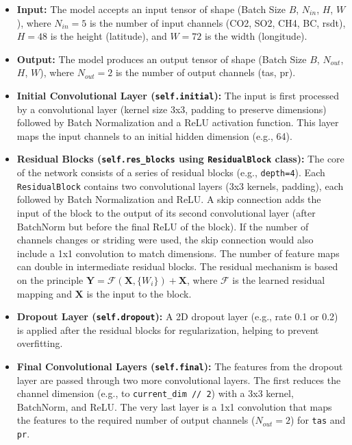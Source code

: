 \documentclass{article}
\begin{document}
\begin{itemize}
    \item \textbf{Input:} The model accepts an input tensor of shape (Batch Size \(B\), \(N_{in}\), \(H\), \(W\)), where \(N_{in}=5\) is the number of input channels (CO2, SO2, CH4, BC, rsdt), \(H=48\) is the height (latitude), and \(W=72\) is the width (longitude).
    \item \textbf{Output:} The model produces an output tensor of shape (Batch Size \(B\), \(N_{out}\), \(H\), \(W\)), where \(N_{out}=2\) is the number of output channels (tas, pr).
    \item \textbf{Initial Convolutional Layer (\texttt{self.initial}):} The input is first processed by a convolutional layer (kernel size 3x3, padding to preserve dimensions) followed by Batch Normalization and a ReLU activation function. This layer maps the input channels to an initial hidden dimension (e.g., 64).
    \item \textbf{Residual Blocks (\texttt{self.res\_blocks} using \texttt{ResidualBlock} class):} The core of the network consists of a series of residual blocks (e.g., \texttt{depth=4}). Each \texttt{ResidualBlock} contains two convolutional layers (3x3 kernels, padding), each followed by Batch Normalization and ReLU. A skip connection adds the input of the block to the output of its second convolutional layer (after BatchNorm but before the final ReLU of the block). If the number of channels changes or striding were used, the skip connection would also include a 1x1 convolution to match dimensions. The number of feature maps can double in intermediate residual blocks.
    The residual mechanism is based on the principle \( \mathbf{Y} = \mathcal{F}(\mathbf{X}, \{W_i\}) + \mathbf{X} \), where \( \mathcal{F} \) is the learned residual mapping and \( \mathbf{X} \) is the input to the block.
    \item \textbf{Dropout Layer (\texttt{self.dropout}):} A 2D dropout layer (e.g., rate 0.1 or 0.2) is applied after the residual blocks for regularization, helping to prevent overfitting.
    \item \textbf{Final Convolutional Layers (\texttt{self.final}):} The features from the dropout layer are passed through two more convolutional layers. The first reduces the channel dimension (e.g., to \texttt{current\_dim // 2}) with a 3x3 kernel, BatchNorm, and ReLU. The very last layer is a 1x1 convolution that maps the features to the required number of output channels (\(N_{out}=2\)) for \texttt{tas} and \texttt{pr}.
\end{itemize}
\end{document}
